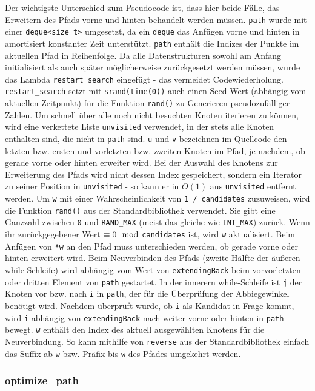 \documentclass[a4paper, 10pt, ngerman]{article}
\begin{document}
Der wichtigste Unterschied zum Pseudocode ist, dass hier beide Fälle, das Erweitern des Pfads vorne und hinten behandelt werden müssen. \verb|path| wurde mit einer \verb|deque<size_t>| umgesetzt, da ein \verb|deque| das Anfügen vorne und hinten in amortisiert konstanter Zeit unterstützt. \verb|path| enthält die Indizes der Punkte im aktuellen Pfad in Reihenfolge. Da alle Datenstrukturen sowohl am Anfang initialisiert als auch später möglicherweise zurückgesetzt werden müssen, wurde das Lambda \verb|restart_search| eingefügt - das vermeidet Codewiederholung. \verb|restart_search| setzt mit \verb|srand(time(0))| auch einen Seed-Wert (abhängig vom aktuellen Zeitpunkt) für die Funktion \verb|rand()| zu Generieren pseudozufälliger Zahlen. Um schnell über alle noch nicht besuchten Knoten iterieren zu können, wird eine verkettete Liste \verb|unvisited| verwendet, in der stets alle Knoten enthalten sind, die nicht in \verb|path| sind. \verb|u| und \verb|v| bezeichnen im Quellcode den letzten bzw. ersten und vorletzten bzw. zweiten Knoten im Pfad, je nachdem, ob gerade vorne oder hinten erweiter wird. Bei der Auswahl des Knotens zur Erweiterung des Pfads wird nicht dessen Index gespeichert, sondern ein Iterator zu seiner Position in \verb|unvisited| - so kann er in $O(1)$ aus \verb|unvisited| entfernt werden. Um \verb|w| mit einer Wahrscheinlichkeit von \verb|1 / candidates| zuzuweisen, wird die Funktion \verb|rand()| aus der Standardbibliothek verwendet. Sie gibt eine Ganzzahl zwischen \verb|0| und \verb|RAND_MAX| (meist das gleiche wie \verb|INT_MAX|) zurück. Wenn ihr zurückgegebener Wert $\equiv 0 \mod$\verb|candidates| ist, wird \verb|w| aktualisiert. Beim Anfügen von \verb|*w| an den Pfad muss unterschieden werden, ob gerade vorne oder hinten erweitert wird. Beim Neuverbinden des Pfads (zweite Hälfte der äußeren while-Schleife) wird abhängig vom Wert von \verb|extendingBack| beim vorvorletzten oder dritten Element von \verb|path| gestartet. In der innerern while-Schleife ist \verb|j| der Knoten vor bzw. nach \verb|i| in \verb|path|, der für die Überprüfung der Abbiegewinkel benötigt wird. Nachdem überprüft wurde, ob \verb|i| als Kandidat in Frage kommt, wird \verb|i| abhängig von \verb|extendingBack| nach weiter vorne oder hinten in \verb|path| bewegt. \verb|w| enthält den Index des aktuell ausgewählten Knotens für die Neuverbindung. So kann mithilfe von \verb|reverse| aus der Standardbibliothek einfach das Suffix ab \verb|w| bzw. Präfix bis \verb|w| des Pfades umgekehrt werden.

\subsubsection{optimize\_path}
\end{document}
